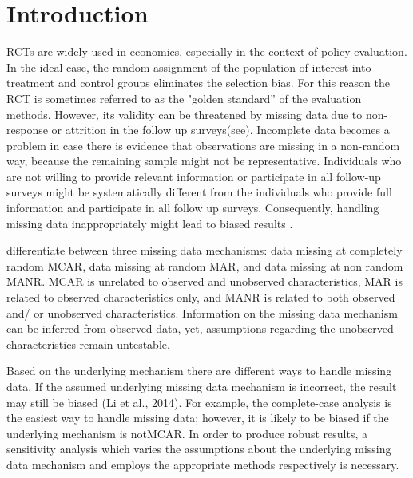 
\section{Introduction}


\acp{RCT} are widely used in economics, especially in the context of policy evaluation. In the ideal case, the random assignment of the population of interest into treatment and control groups eliminates the selection bias. For this reason the \ac{RCT} is sometimes referred to as the "golden standard'' of the evaluation methods.
However, its validity can be threatened by missing data due to non-response or attrition in the follow up surveys(see\cite{angristmostly2008}). Incomplete data becomes a problem in case there is evidence that observations are missing in a non-random way, because the remaining sample might not be representative. Individuals who are not willing to provide relevant information or participate in all follow-up surveys might be systematically different from the individuals who provide full information and participate in all follow up surveys. Consequently, handling missing data inappropriately might lead to biased results \cite{heckman1976common, lee2009training, kling2007experimental}.


\cite{little1989analysis} differentiate between three missing data mechanisms: data missing at completely random \ac{MCAR}, data missing at random \ac{MAR}, and data missing at non random \ac{MANR}. \ac{MCAR} is unrelated to observed and unobserved characteristics, \ac{MAR} is related to observed characteristics only, and \ac{MANR} is related to both observed and/ or unobserved characteristics. Information on the missing data mechanism can be inferred from observed data, yet, assumptions regarding the unobserved characteristics remain untestable.

Based on the underlying mechanism there are different ways to handle missing data. If the assumed underlying missing data mechanism is incorrect, the result may still be biased (Li et al., 2014). For example, the complete-case analysis is the easiest way to handle missing data; however, it is likely to be biased if the underlying mechanism is not\ac{MCAR}. In order to produce robust results, a sensitivity analysis which varies the assumptions about the underlying missing data mechanism and employs the appropriate methods respectively is necessary.

